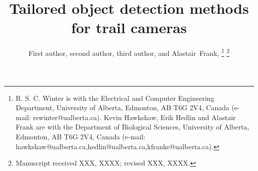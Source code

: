 \documentclass[journal]{IEEEtran}
\begin{document}
%
\title{Tailored object detection methods for trail cameras}
%
%
%

\author{First author,
	second author,
	third author, 
	and Alastair~Frank,
	\thanks{R. S. C. Winter  is with the Electrical and Computer Engineering Department, University of Alberta, Edmonton, AB T6G 2V4, Canada (e-mail: rswinter@ualberta.ca).\newline
		Kevin Hawkshaw, Erik Hedlin and Alastair Frank are with the Department of Biological Sciences, University of Alberta, Edmonton, AB T6G 2V4, Canada (e-mail: hawkshaw@ualberta.ca,hedlin@ualberta.ca,kfranke@ualberta.ca). 
	}%
\thanks{Manuscript received XXX, XXXX; revised XXX, XXXX.}}

% 
%
\end{document}
